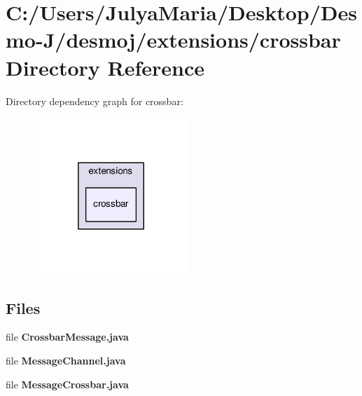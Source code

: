 \section{C\-:/\-Users/\-Julya\-Maria/\-Desktop/\-Desmo-\/\-J/desmoj/extensions/crossbar Directory Reference}
\label{dir_8a5112e9ec315a05e167a26856184598}
Directory dependency graph for crossbar\-:
\nopagebreak
\begin{figure}[H]
\begin{center}
\leavevmode
\includegraphics[width=166pt]{dir_8a5112e9ec315a05e167a26856184598_dep}
\end{center}
\end{figure}
\subsection*{Files}
\begin{DoxyCompactItemize}
\item 
file {\bfseries Crossbar\-Message.\-java}
\item 
file {\bfseries Message\-Channel.\-java}
\item 
file {\bfseries Message\-Crossbar.\-java}
\end{DoxyCompactItemize}
